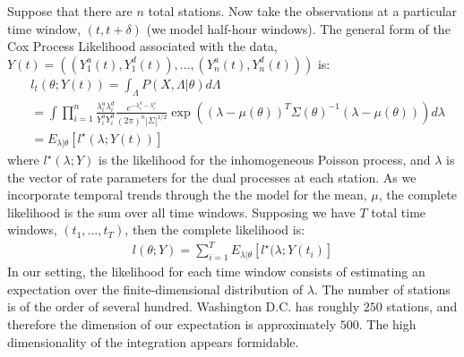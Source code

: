 \documentclass{acm_proc_article-sp}
\begin{document}
Suppose that there are $n$ total stations. Now take the observations at a particular time window, $(t , t+\delta)$ (we model half-hour windows).  The general form of the Cox Process Likelihood associated with the data, \\ $Y(t) = \left( (Y_1^{a} (t), Y_1^{d} (t)), \ldots, (Y_n^{a} (t), Y_n^{d} (t)) \right) $ is:
\begin{align*}
&l_t( \theta; Y(t) ) = \int_{\Lambda} P(X,  \Lambda | \theta) d \Lambda \\
&= \int\prod_{i=1}^n \frac{\lambda_i^{a} \lambda_i^{d}}{Y_i^{a} Y_i^{d}} \frac{e^{-\lambda_i^{d}-\lambda_i^{a} }}{(2 \pi)^{n} |\Sigma|^{1/2}} \exp \left( (\lambda - \mu (\theta) )^T \Sigma (\theta) ^{-1} (\lambda - \mu (\theta) ) \right) d \lambda \\
&= E_{\lambda | \theta} [l^{\star} ( \lambda; Y(t))]
\end{align*}
\noindent where $l^{\star} ( \lambda; Y)$ is the likelihood for the inhomogeneous Poisson process, and $\lambda$ is the vector of rate parameters for the dual processes at each station.  As we incorporate temporal trends through the the model for the mean, $\mu$, the complete likelihood is the sum over all time windows.  Supposing we have $T$ total time windows, $(t_1, \ldots, t_T)$, then the complete likelihood is:
\begin{align*}
l ( \theta; Y ) = \sum_{i=1}^T  E_{\lambda | \theta} [l^{\star} ( \lambda; Y (t_i)]
\end{align*}
In our setting, the likelihood for each time window consists of estimating an expectation over the finite-dimensional distribution of $\lambda$.  The number of stations is of the order of several hundred.  Washington D.C. has roughly $250$ stations, and therefore the dimension of our expectation is approximately $500$.  The high dimensionality of the integration appears formidable. 
\end{document}
